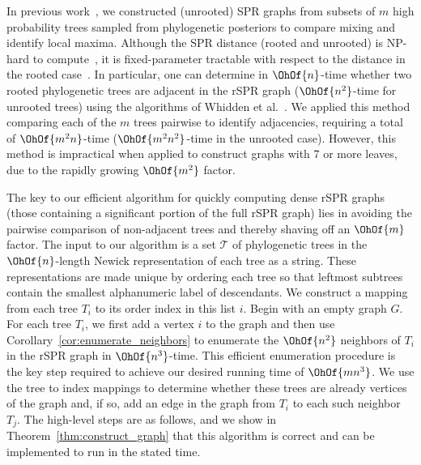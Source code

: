 \documentclass[11pt]{amsart}
\begin{document}
In previous work~\cite{Whidden2015-yi}, we constructed (unrooted) SPR graphs from subsets of $m$ high probability trees sampled from phylogenetic posteriors to compare mixing and identify local maxima.
Although the SPR distance (rooted and unrooted) is NP-hard to compute~\cite{bordewich05,hickey2008sdc}, it is fixed-parameter tractable with respect to the distance in the rooted case~\cite{bordewich05}.
In particular, one can determine in $\OhOf{n}$-time whether two rooted phylogenetic trees are adjacent in the rSPR graph ($\OhOf{n^2}$-time for unrooted trees) using the algorithms of Whidden et al.~\cite{whidden2009unifying,whidden2010fast, whidden2013hybridization,Whidden2015-yi}.
We applied this method comparing each of the $m$ trees pairwise to identify adjacencies, requiring a total of $\OhOf{m^2n}$-time ($\OhOf{m^2 n^2}$-time in the unrooted case).
However, this method is impractical when applied to construct graphs with 7 or more leaves, due to the rapidly growing $\OhOf{m^2}$ factor.

The key to our efficient algorithm for quickly computing dense rSPR graphs (those containing a significant portion of the full rSPR graph) lies in avoiding the pairwise comparison of non-adjacent trees and thereby shaving off an $\OhOf{m}$ factor.
The input to our algorithm is a set $\mathcal{T}$ of phylogenetic trees in the $\OhOf{n}$-length Newick \cite{wiki:newick} representation of each tree as a string.
These representations are made unique by ordering each tree so that leftmost subtrees contain the smallest alphanumeric label of descendants.
We construct a mapping from each tree $T_i$ to its order index in this list $i$.
Begin with an empty graph $G$.
For each tree $T_i$, we first add a vertex $i$ to the graph and then use Corollary~\ref{cor:enumerate_neighbors} to enumerate the $\OhOf{n^2}$ neighbors of $T_i$ in the rSPR graph in $\OhOf{n^3}$-time.
This efficient enumeration procedure is the key step required to achieve our desired running time of $\OhOf{mn^3}$.
We use the tree to index mappings to determine whether these trees are already vertices of the graph and, if so, add an edge in the graph from $T_i$ to each such neighbor $T_j$.
The high-level steps are as follows, and we show in Theorem~\ref{thm:construct_graph} that this algorithm is correct and can be implemented to run in the stated time.
\end{document}

